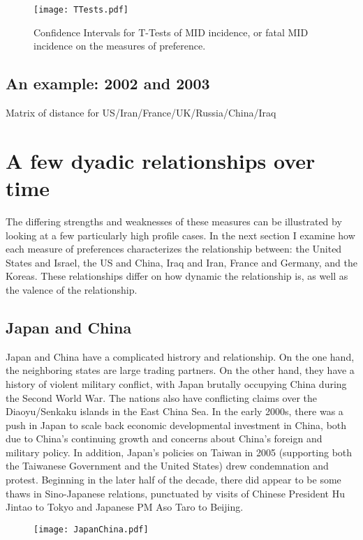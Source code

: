 \documentclass[12pt,onesided,fullpage]{amsart}
\begin{document}
\begin{figure}[htb]
\center
\texttt{[image: TTests.pdf]}
\caption{Confidence Intervals for T-Tests of MID incidence, or fatal MID incidence on the measures of preference.}
\label{ttest}
\end{figure}
\subsection{An example: 2002 and 2003}
Matrix of distance for US/Iran/France/UK/Russia/China/Iraq
\section{A few dyadic relationships over time}
The differing strengths and weaknesses of these measures can be illustrated by looking at a few particularly high profile cases. In the next section I  examine how each measure of preferences characterizes the relationship between: the United States and Israel, the US and China, Iraq and Iran, France and Germany, and the Koreas. These relationships differ on how dynamic the relationship is, as well as the valence of the relationship.

\subsection{Japan and China}
Japan and China have a complicated histrory and relationship. On the one hand, the neighboring states are large trading partners. On the other hand, they have a history of violent military conflict, with Japan brutally occupying China during the Second World War. The nations also have conflicting claims over the Diaoyu/Senkaku islands in the East China Sea.  In the early 2000s, there was a push in Japan to scale back economic developmental investment in China, both due to China's continuing growth and concerns about China's foreign and military policy. In addition, Japan's policies on Taiwan in 2005 (supporting both the Taiwanese Government and the United States) drew condemnation and protest. Beginning in the later half of the decade, there did appear to be some thaws in Sino-Japanese relations, punctuated by visits of Chinese President Hu Jintao to Tokyo and Japanese PM Aso Taro to Beijing.

\begin{figure}
\texttt{[image: JapanChina.pdf]}
\end{figure}
\end{document}
